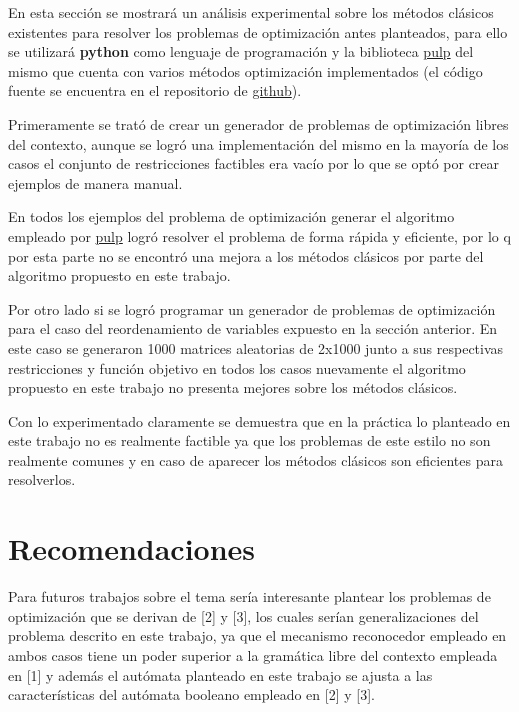 \documentclass{article}
\begin{document}
En esta sección se mostrará un análisis experimental sobre los métodos clásicos existentes para resolver los problemas de optimización antes
planteados, para ello se utilizará \textbf{python} como lenguaje de programación y la biblioteca \href{https://pypi.org/project/PuLP/}{pulp} del mismo 
que cuenta con varios métodos optimización implementados (el código fuente se encuentra en el repositorio de \href{https://github.com/ARJ-Code/MMA-Project}{github}).

Primeramente se trató de crear un generador de problemas de optimización libres del contexto, aunque se logró una implementación del mismo en la mayoría
de los casos el conjunto de restricciones factibles era vacío por lo que se optó por crear ejemplos de manera manual.

En todos los ejemplos del problema de optimización generar el algoritmo empleado por \href{https://pypi.org/project/PuLP/}{pulp} logró resolver el problema
de forma rápida y eficiente, por lo q por esta parte no se encontró una mejora a los métodos clásicos por parte del algoritmo propuesto en este trabajo.

Por otro lado si se logró programar un generador de problemas de optimización para el caso del reordenamiento de variables expuesto en la sección anterior.
En este caso se generaron 1000 matrices aleatorias de 2x1000 junto a sus respectivas restricciones y función objetivo en todos los casos nuevamente el algoritmo
propuesto en este trabajo no presenta mejores sobre los métodos clásicos.

Con lo experimentado claramente se demuestra que en la práctica lo planteado en este trabajo no es realmente factible ya que los problemas de este estilo 
no son realmente comunes y en caso de aparecer los métodos clásicos son eficientes para resolverlos.

\section*{Recomendaciones}

Para futuros trabajos sobre el tema sería interesante plantear los problemas de optimización que se derivan de [2] y [3], los cuales serían generalizaciones
del problema descrito en este trabajo, ya que el mecanismo reconocedor empleado en ambos casos tiene un poder superior a la gramática libre del contexto empleada
en [1] y además el autómata planteado en este trabajo se ajusta a las características del autómata booleano empleado en [2] y [3].
\end{document}
